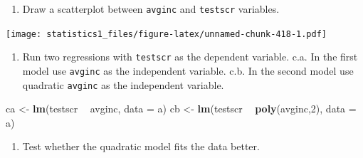 \documentclass[]{article}
\newenvironment{Shaded}{\begin{snugshade}}{\end{snugshade}}
\newcommand{\KeywordTok}[1]{\textcolor[rgb]{0.13,0.29,0.53}{\textbf{#1}}}
\newcommand{\DataTypeTok}[1]{\textcolor[rgb]{0.13,0.29,0.53}{#1}}
\newcommand{\DecValTok}[1]{\textcolor[rgb]{0.00,0.00,0.81}{#1}}
\newcommand{\StringTok}[1]{\textcolor[rgb]{0.31,0.60,0.02}{#1}}
\newcommand{\OtherTok}[1]{\textcolor[rgb]{0.56,0.35,0.01}{#1}}
\newcommand{\OperatorTok}[1]{\textcolor[rgb]{0.81,0.36,0.00}{\textbf{#1}}}
\newcommand{\NormalTok}[1]{#1}
\providecommand{\tightlist}{%
  \setlength{\itemsep}{0pt}\setlength{\parskip}{0pt}}
\theoremstyle{definition}
\theoremstyle{definition}
\theoremstyle{definition}
\theoremstyle{remark}
\begin{document}
\begin{enumerate}
\def\labelenumi{\alph{enumi}.}
\setcounter{enumi}{1}
\tightlist
\item
  Draw a scatterplot between \texttt{avginc} and \texttt{testscr}
  variables.
\end{enumerate}

\begin{Shaded}
\end{Shaded}

\texttt{[image: statistics1\_files/figure-latex/unnamed-chunk-418-1.pdf]}

\begin{enumerate}
\def\labelenumi{\alph{enumi}.}
\setcounter{enumi}{2}
\tightlist
\item
  Run two regressions with \texttt{testscr} as the dependent variable.
  c.a. In the first model use \texttt{avginc} as the independent
  variable. c.b. In the second model use quadratic \texttt{avginc} as
  the independent variable.
\end{enumerate}

\begin{Shaded}
\begin{Highlighting}[]
\NormalTok{ca <-}\StringTok{ }\KeywordTok{lm}\NormalTok{(testscr }\OperatorTok{~}\StringTok{ }\NormalTok{avginc, }\DataTypeTok{data =}\NormalTok{ a)}
\NormalTok{cb <-}\StringTok{ }\KeywordTok{lm}\NormalTok{(testscr }\OperatorTok{~}\StringTok{ }\KeywordTok{poly}\NormalTok{(avginc,}\DecValTok{2}\NormalTok{), }\DataTypeTok{data =}\NormalTok{ a)}
\end{Highlighting}
\end{Shaded}

\begin{enumerate}
\def\labelenumi{\alph{enumi}.}
\setcounter{enumi}{3}
\tightlist
\item
  Test whether the quadratic model fits the data better.
\end{enumerate}
\end{document}
